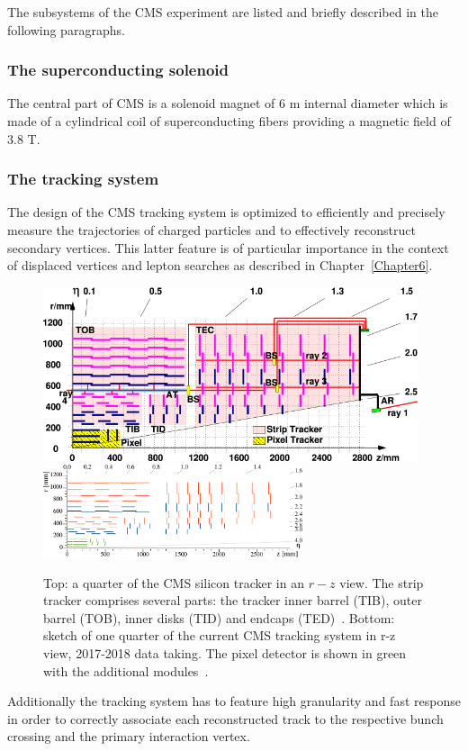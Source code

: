 The subsystems of the CMS experiment are listed and briefly described
in the following paragraphs.

\subsubsection{The superconducting solenoid}
The central part of CMS is a solenoid magnet of 6 m internal diameter
which is made of a cylindrical coil of superconducting fibers
providing a magnetic field of 3.8 T. 
\subsubsection{The tracking system}\label{sec:tracking}
The design of the CMS tracking system is optimized to
efficiently and precisely measure the trajectories of charged
particles and to effectively reconstruct secondary vertices. This latter feature is of particular
importance in the context of displaced vertices and lepton searches as
described in Chapter~\ref{Chapter6}.

\begin{figure}[h]
\centering
\includegraphics[width=0.98\textwidth]{Figures/c2/las}\\
\vspace{0.5cm}
\includegraphics[width=0.68\textwidth]{Figures/c2/Phase1_Tracker_1Quarter.pdf}

\caption{Top: a quarter of the CMS silicon tracker in an $r-z$
  view. The strip tracker comprises several parts: the tracker inner
  barrel (TIB), outer barrel (TOB), inner disks (TID) and endcaps
  (TED)~\cite{Adam:1171503}. Bottom:
sketch of one quarter of the current CMS tracking system in
  r-z view, 2017-2018 data taking. The pixel detector is shown in
  green with the additional modules~\cite{trackingPU}.}
\label{fig:tracker}
\end{figure} 
Additionally the tracking system has to feature high granularity and
fast response in order to correctly associate each reconstructed track
to the respective bunch crossing and the primary interaction vertex.

